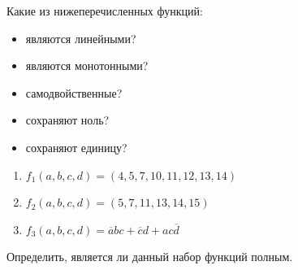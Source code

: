 \documentclass[a4paper,12pt,oneside]{article}
\begin{document}

Какие из нижеперечисленных функций:
\begin{itemize}
    \item[(а)] являются линейными?
    \item[(б)] являются монотонными?
    \item[(в)] самодвойственные?
    \item[(г)] сохраняют ноль?
    \item[(д)] сохраняют единицу?
\end{itemize}

\begin{enumerate}[label=\bfseries f\arabic*)]
    \item $f_1(a,b,c,d)=(4,5,7,10,11,12,13,14)$
    \item $f_2(a,b,c,d)=(5,7,11,13,14,15)$
    \item $f_3(a,b,c,d)=\overline{a}bc+\overline{c}d+ac\overline{d}$
\end{enumerate}

\noindent
Определить, является ли данный набор функций полным.
\end{document}
